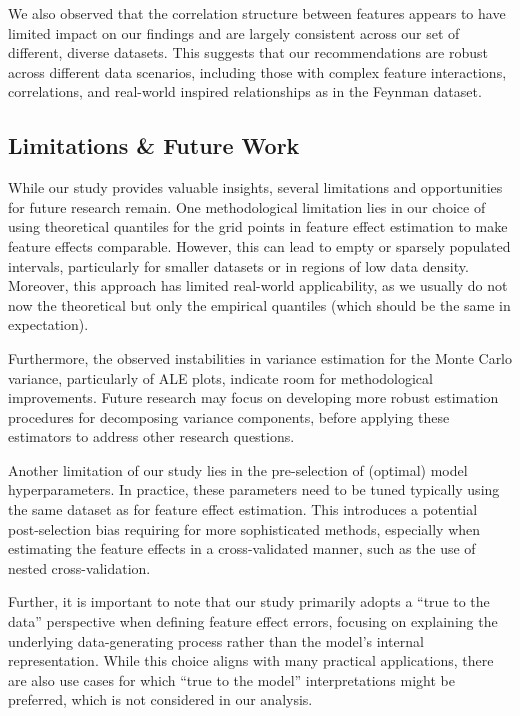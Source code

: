 \documentclass[runningheads]{llncs}
\begin{document}
We also observed that the correlation structure between features appears to have limited impact on our findings
and are largely consistent across our set of different, diverse datasets.
This suggests that our recommendations are robust across different data scenarios,
including those with complex feature interactions, correlations, 
and real-world inspired relationships as in the Feynman dataset.

\subsection{Limitations \& Future Work}

While our study provides valuable insights, several limitations and opportunities
for future research remain. One methodological limitation lies in our choice of using
theoretical quantiles for the grid points in feature effect estimation to make feature
effects comparable. However, this can lead to empty or sparsely populated intervals, particularly for smaller
datasets or in regions of low data density. Moreover, this approach has limited real-world
applicability, as we usually do not now the theoretical but only the empirical quantiles
(which should be the same in expectation).

Furthermore, the observed instabilities in variance estimation for the Monte Carlo variance,
particularly of ALE plots, indicate room for methodological improvements. Future research may
focus on developing more robust estimation procedures for decomposing variance components,
before applying these estimators to address other research questions.

Another limitation of our study lies in the pre-selection of (optimal) model hyperparameters.
In practice, these parameters need to be tuned typically using the same dataset as for feature
effect estimation. This introduces a potential post-selection bias requiring for more sophisticated
methods, especially when estimating the feature effects in a cross-validated manner, such as
the use of nested cross-validation.

Further, it is important to note that our study primarily adopts a ``true to the data'' perspective
when defining feature effect errors, focusing on explaining the underlying data-generating process
rather than the model's internal representation. While this choice aligns with many practical
applications, there are also use cases for which ``true to the model'' interpretations might be 
preferred, which is not considered in our analysis.
\end{document}

